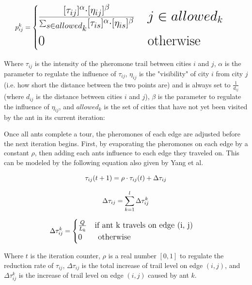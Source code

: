 \documentclass{article}
\begin{document}
\begin{equation}
        \huge p_{ij}^k = 
        \begin{cases}
            \frac{[\tau_{ij}]^\alpha \cdot [\eta_{ij}]^\beta}{\sum_{s\in allowed_k} [\tau_{is}]^\alpha \cdot [\eta_{is}]^\beta} \quad j \in allowed_k\\
            0 \quad\quad\quad\quad\quad\quad\quad\quad \text{otherwise}
        \end{cases}
    \end{equation}

Where $\tau_{ij}$ is the intensity of the pheromone trail between cities $i$ and $j$, $\alpha$ is the parameter to regulate the influence of $\tau_{ij}$, $\eta_{ij}$ is the "visibility" of city $i$ from city $j$ (i.e. how short the distance between the two points are) and is always set to $\frac{1}{d_{ij}}$ (where $d_{ij}$ is the distance between cities $i$ and $j$), $\beta$ is the parameter to regulate the influence of $\eta_{ij}$, and $allowed_k$ is the set of cities that have not yet been visited by the ant in its current iteration:

Once all ants complete a tour, the pheromones of each edge are adjusted before the next iteration begins. First, by evaporating the pheromones on each edge by a constant $\rho$, then adding each ants influence to each edge they traveled on. This can be modeled by the following equation also given by Yang et al.\cite{yang2008ant}


\begin{equation}
        \large \tau_{ij}(t + 1) = \rho \cdot \tau_{ij}(t) + \Delta \tau_{ij}
    \end{equation}

    \begin{equation}
        \large \Delta \tau_{ij} = \sum_{k=1}^l \Delta \tau_{ij}^k
    \end{equation}

    \begin{equation}
        \large \Delta \tau_{ij}^k = 
        \begin{cases}
            \frac{Q}{L_k} \quad \text{if ant k travels on edge (i, j)} \\
            0 \quad\quad \text{otherwise}
        \end{cases}
    \end{equation}

    Where $t$ is the iteration counter, $\rho$ is a real number $[0, 1]$ to regulate the reduction rate of $\tau_{ij}$, $\Delta \tau_{ij}$ is the total increase of trail level on edge $(i, j)$, and $\Delta \tau_{ij}^k$ is the increase of trail level on edge $(i, j)$ caused by ant $k$.
\end{document}
